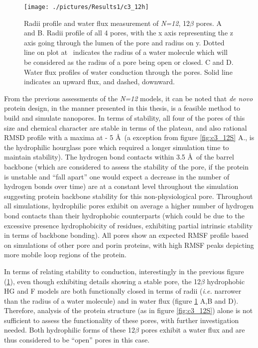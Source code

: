 \begin{figure}[H]
\begin{center}
\texttt{[image: ./pictures/Results1/c3\_12h]}
\caption[Radii profile and water flux measurement of \textit{N=12}, 12$\beta$ pores.] {Radii profile and water flux measurement of \textit{N=12}, 12$\beta$ pores. A and B. Radii profile of all 4 pores, with the x axis representing the z axis going through the lumen of the pore and radius on y. Dotted line on plot at  \angstrom\ indicates the radius of a water molecule which will be considered as the radius of a pore being open or closed. C and D. Water flux profiles of water conduction through the pores. Solid line indicates an upward flux, and dashed, downward.}
\label{fig:c3_12h}
\end{center}
\end{figure}


From the previous assessments of the \textit{N=12} models, it can be noted that \textit{de novo} protein design, in the manner presented in this thesis, is a feasible method to build and simulate nanopores. In terms of stability, all four of the pores of this size and chemical character are stable in terms of the plateau, and also rational RMSD profile with a maxima at  - 5 \AA\ (a exception from figure \ref{fig:c3_12S} A., is the hydrophilic hourglass pore which required a longer simulation time to maintain stability). The hydrogen bond contacts within 3.5 \AA\ of the barrel backbone (which are considered to assess the stability of the pore, if the protein is unstable and ``fall apart'' one would expect a decrease in the number of hydrogen bonds over time) are at a constant level throughout the simulation suggesting protein backbone stability for this non-physiological pore. Throughout all simulations, hydrophilic pores exhibit on average a higher number of hydrogen bond contacts than their hydrophobic counterparts (which could be due to the excessive presence hydrophobicity of residues, exhibiting partial intrinsic stability in terms of backbone bonding). All pores show an expected RMSF profile based on simulations of other pore and porin proteins, with high  RMSF peaks depicting more mobile loop regions of the protein. 

In terms of relating stability to conduction, interestingly in the previous figure (\ref{fig:c3_12h}), even though exhibiting details showing a stable pore, the 12$\beta$ hydrophobic HG and F models are both functionally closed in terms of radii (\textit{i.e.} narrower than the radius of a water molecule) and in water flux (figure \ref{fig:c3_12h} A,B and D). Therefore, analysis of the protein structure (as in figure \ref{fig:c3_12S}) alone is not sufficient to assess the functionality of these pores, with further investigation needed. Both hydrophilic forms of these 12$\beta$ pores exhibit a water flux and are thus considered to be ``open'' pores in this case. 

